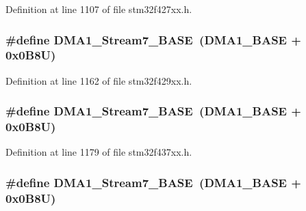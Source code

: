 Definition at line 1107 of file stm32f427xx.\+h.

\subsubsection[{\texorpdfstring{D\+M\+A1\+\_\+\+Stream7\+\_\+\+B\+A\+SE}{DMA1_Stream7_BASE}}]{\setlength{\rightskip}{0pt plus 5cm}\#define D\+M\+A1\+\_\+\+Stream7\+\_\+\+B\+A\+SE~({\bf D\+M\+A1\+\_\+\+B\+A\+SE} + 0x0\+B8\+U)}\hypertarget{group___peripheral__memory__map_ga82186dd6d3f60995d428b34c041919d7}{}\label{group___peripheral__memory__map_ga82186dd6d3f60995d428b34c041919d7}


Definition at line 1162 of file stm32f429xx.\+h.

\subsubsection[{\texorpdfstring{D\+M\+A1\+\_\+\+Stream7\+\_\+\+B\+A\+SE}{DMA1_Stream7_BASE}}]{\setlength{\rightskip}{0pt plus 5cm}\#define D\+M\+A1\+\_\+\+Stream7\+\_\+\+B\+A\+SE~({\bf D\+M\+A1\+\_\+\+B\+A\+SE} + 0x0\+B8\+U)}\hypertarget{group___peripheral__memory__map_ga82186dd6d3f60995d428b34c041919d7}{}\label{group___peripheral__memory__map_ga82186dd6d3f60995d428b34c041919d7}


Definition at line 1179 of file stm32f437xx.\+h.

\subsubsection[{\texorpdfstring{D\+M\+A1\+\_\+\+Stream7\+\_\+\+B\+A\+SE}{DMA1_Stream7_BASE}}]{\setlength{\rightskip}{0pt plus 5cm}\#define D\+M\+A1\+\_\+\+Stream7\+\_\+\+B\+A\+SE~({\bf D\+M\+A1\+\_\+\+B\+A\+SE} + 0x0\+B8\+U)}\hypertarget{group___peripheral__memory__map_ga82186dd6d3f60995d428b34c041919d7}{}\label{group___peripheral__memory__map_ga82186dd6d3f60995d428b34c041919d7}



